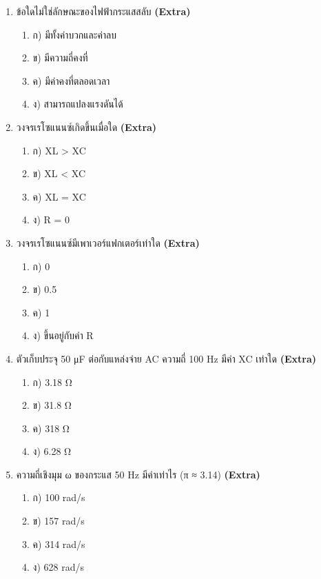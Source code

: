 \documentclass[12pt]{article}
\begin{document}
\begin{enumerate}[label=\arabic*.]
\begin{enumerate}[label=)]
\item ก) 800 W
\item ข) 500 W
\item ค) 640 W
\item ง) 1,000 W
\end{enumerate}
\item ข้อใดไม่ใช่ลักษณะของไฟฟ้ากระแสสลับ \hfill \textbf{\small (Extra)}
\begin{enumerate}[label=)]
\item ก) มีทั้งค่าบวกและค่าลบ
\item ข) มีความถี่คงที่
\item ค) มีค่าคงที่ตลอดเวลา
\item ง) สามารถแปลงแรงดันได้
\end{enumerate}
\item วงจรเรโซแนนซ์เกิดขึ้นเมื่อใด \hfill \textbf{\small (Extra)}
\begin{enumerate}[label=)]
\item ก) XL > XC
\item ข) XL < XC
\item ค) XL = XC
\item ง) R = 0
\end{enumerate}
\item วงจรเรโซแนนซ์มีเพาเวอร์แฟกเตอร์เท่าใด \hfill \textbf{\small (Extra)}
\begin{enumerate}[label=)]
\item ก) 0
\item ข) 0.5
\item ค) 1
\item ง) ขึ้นอยู่กับค่า R
\end{enumerate}
\item ตัวเก็บประจุ 50 μF ต่อกับแหล่งจ่าย AC ความถี่ 100 Hz มีค่า XC เท่าใด \hfill \textbf{\small (Extra)}
\begin{enumerate}[label=)]
\item ก) 3.18 Ω
\item ข) 31.8 Ω
\item ค) 318 Ω
\item ง) 6.28 Ω
\end{enumerate}
\item ความถี่เชิงมุม ω ของกระแส 50 Hz มีค่าเท่าไร (π ≈ 3.14) \hfill \textbf{\small (Extra)}
\begin{enumerate}[label=)]
\item ก) 100 rad/s
\item ข) 157 rad/s
\item ค) 314 rad/s
\item ง) 628 rad/s

\end{enumerate}
\end{enumerate}
\end{document}
